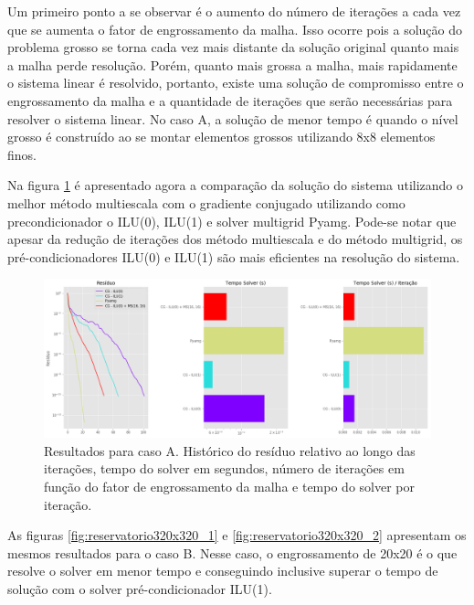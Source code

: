 Um primeiro ponto a se observar é o aumento do número de iterações a cada vez que se aumenta o fator de engrossamento da malha. Isso ocorre pois a solução do problema grosso se torna cada vez mais distante da solução  original quanto mais a malha perde resolução. Porém, quanto mais grossa a malha, mais rapidamente o sistema linear é resolvido, portanto, existe uma solução de compromisso entre o engrossamento da malha e a quantidade de iterações que serão necessárias para resolver o sistema linear. No caso A, a solução de menor tempo é quando o nível grosso é construído ao se montar elementos grossos utilizando 8x8 elementos finos. 

Na figura \ref{fig:reservatorio100x100_2} é apresentado agora a comparação da solução do sistema utilizando o melhor método multiescala com o gradiente conjugado utilizando como precondicionador o ILU(0), ILU(1) e solver multigrid Pyamg. Pode-se notar que apesar da redução de iterações dos método multiescala e do método multigrid, os pré-condicionadores ILU(0) e ILU(1) são mais eficientes na resolução do sistema. 


\begin{figure}[!htbp]
\label{fig:reservatorio100x100_2}
\centering
\includegraphics[width=\textwidth]{chap08/figs/reservatorio100x100_2.png}
\caption{Resultados para caso A. Histórico do resíduo relativo ao longo das iterações, tempo do solver em segundos, número de iterações em função do fator de engrossamento da malha e tempo do solver por iteração. }
\end{figure}


As figuras \ref{fig:reservatorio320x320_1} e \ref{fig:reservatorio320x320_2} apresentam os mesmos resultados para o caso B. Nesse caso, o engrossamento de 20x20 é o que resolve o solver em menor tempo e conseguindo inclusive superar o tempo de solução com o solver pré-condicionador ILU(1).


